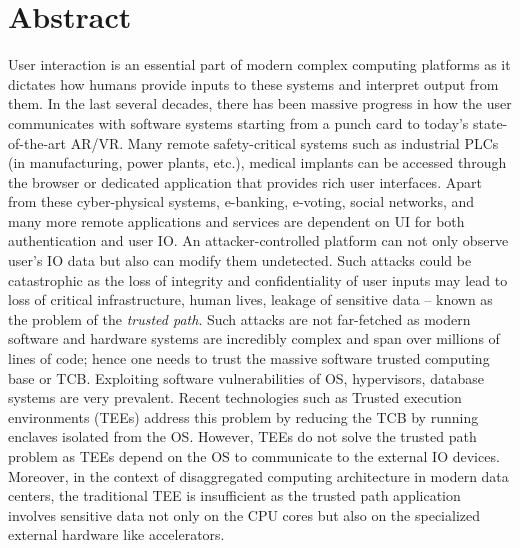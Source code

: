 \begingroup
\let\clearpage\relax
\let\cleardoublepage\relax
\let\cleardoublepage\relax

\chapter*{Abstract}

User interaction is an essential part of modern complex computing platforms as it dictates how humans provide inputs to these systems and interpret output from them. In the last several decades, there has been massive progress in how the user communicates with software systems starting from a punch card to today's state-of-the-art AR/VR. Many remote safety-critical systems such as industrial PLCs (in manufacturing, power plants, etc.), medical implants can be accessed through the browser or dedicated application that provides rich user interfaces. Apart from these cyber-physical systems, e-banking, e-voting, social networks, and many more remote applications and services are dependent on UI for both authentication and user IO. An attacker-controlled platform can not only observe user's IO data but also can modify them undetected. Such attacks could be catastrophic as the loss of integrity and confidentiality of user inputs may lead to loss of critical infrastructure, human lives, leakage of sensitive data -- known as the problem of the \emph{trusted path}. Such attacks are not far-fetched as modern software and hardware systems are incredibly complex and span over millions of lines of code; hence one needs to trust the massive software trusted computing base or TCB. Exploiting software vulnerabilities of OS, hypervisors, database systems are very prevalent. Recent technologies such as Trusted execution environments (TEEs) address this problem by reducing the TCB by running enclaves isolated from the OS. However, TEEs do not solve the trusted path problem as TEEs depend on the OS to communicate to the external IO devices. Moreover, in the context of disaggregated computing architecture in modern data centers, the traditional TEE is insufficient as the trusted path application involves sensitive data not only on the CPU cores but also on the specialized external hardware like accelerators.


